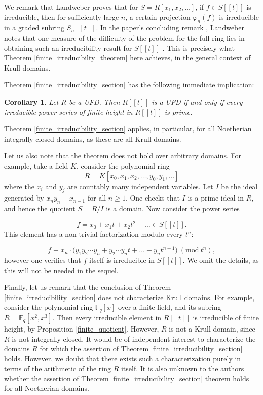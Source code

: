 \documentclass{article}
\newcommand{\F}{\mathbb{F}}
\newcommand{\Mod}[1]{\ (\mathrm{mod}\ #1)}
\theoremstyle{plain}
\newtheorem{corollary}[theorem]{Corollary}
\theoremstyle{definition}
\theoremstyle{remark}
\theoremstyle{plain}
\begin{document}
We remark that Landweber proves \cite[\S3, (3.4)]{Landweber74} that for $S = R[x_1,x_2,\ldots]$, if $f \in S[[t]]$ is irreducible, then for sufficiently large $n$, a certain projection $\varphi_n(f)$ is irreducible in a graded subring $S_n[[t]]$. In the paper's concluding remark \cite[Remark 3.9]{Landweber74}, Landweber notes that one measure of the difficulty of the problem for the full ring lies in obtaining such an irreducibility result for $S[[t]]$ . This is precisely what Theorem \ref{finite_irreducibilty_theorem} here achieves, in the general context of Krull domains.

Theorem \ref{finite_irreducibility_section} has the following immediate implication:

\begin{corollary}\label{cor:finite_height_ufd_criterion}
    Let $R$ be a UFD. Then $R[[t]]$ is a UFD if and only if every irreducible power series of finite height in $R[[t]]$ is prime. 
\end{corollary} 
Theorem \ref{finite_irreducibility_section} applies, in particular, for all Noetherian integrally closed domains, as these are all Krull domains. 

Let us also note that the theorem does not hold over arbitrary domains. For example, take a field $K$, consider the polynomial ring $$R = K[x_0,x_1,x_2,\ldots,y_0,y_1,\ldots]$$ where the $x_i$ and $y_j$ are countably many independent variables. Let $I$ be the ideal generated by $x_ny_n-x_{n-1}$ for all $n \geq 1$. One checks that $I$ is a prime ideal in $R$, and hence the quotient $S = R/I$ is a domain. Now consider the power series

$$f = x_0+x_1t+x_2t^2+\ldots \in S[[t]].$$
This element has a non-trivial factorization modulo every $t^n$:

$$f \equiv x_n\cdot\big(y_1y_2 \cdots  y_n+y_2 \cdots y_n t + \ldots +y_nt^{n-1}\big) \Mod{t^n},$$ however one verifies that $f$ itself is irreducible in $S[[t]]$. We omit the details, as this will not be needed in the sequel.

Finally, let us remark that the conclusion of Theorem \ref{finite_irreducibility_section} does not characterize Krull domains. For example, consider the polynomial ring $\F_q[x]$ over a finite field, and its subring $R= \F_q[x^2,x^{3}]$. Then every irreducible element in $R[[t]]$ is irreducible of finite height, by Proposition \ref{finite_quotient}. However, $R$ is not a Krull domain, since $R$ is not integrally closed. It would be of independent interest to characterize the domains $R$ for which the assertion of Theorem \ref{finite_irreducibility_section} holds. However, we doubt that there exists such a characterization purely in terms of the arithmetic of the ring $R$ itself. It is also unknown to the authors whether the assertion of Theorem \ref{finite_irreducibility_section} theorem holds for all Noetherian domains.
\end{document}
